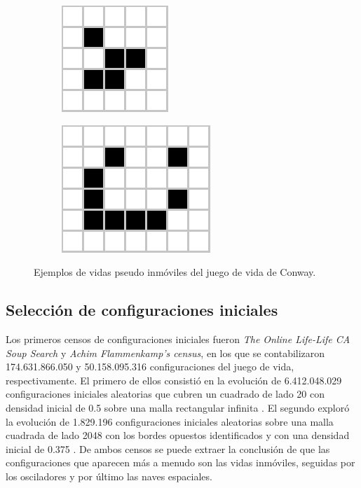 \documentclass[../proyecto.tex]{memoir}
\begin{document}
\begin{figure}[H]
	\centering
	\begin{subfigure}[b]{0.3\linewidth} 
        \centering
        \includegraphics[height=.35\linewidth]{./images/glider.png}
        \caption{}
        \label{fig:glider}
    \end{subfigure}
    \quad
	\begin{subfigure}[b]{0.3\linewidth} 
        \centering
        \includegraphics[height=0.45\linewidth]{./images/lightweightspaceship.png}
        \caption{}
        \label{fig:lightweightspaceship}
    \end{subfigure}
	\caption{Ejemplos de vidas pseudo inmóviles del juego de vida de Conway.}
	\label{fig:congIniciales4}
\end{figure} 

\subsection{Selección de configuraciones iniciales} \label{seleccion}

Los primeros censos de configuraciones iniciales fueron \textit{The Online Life-Life CA Soup Search} y \textit{Achim Flammenkamp's census}, en los que se contabilizaron 174.631.866.050 y 50.158.095.316 configuraciones del juego de vida, respectivamente. El primero de ellos consistió en la evolución de 6.412.048.029 configuraciones iniciales aleatorias que cubren un cuadrado de lado 20 con densidad inicial de 0.5 sobre una malla rectangular infinita \cite{sopa1}. El segundo exploró la evolución de 1.829.196 configuraciones iniciales aleatorias sobre una malla cuadrada de lado 2048 con los bordes opuestos identificados y con una densidad inicial de 0.375 \cite{sopa2}. De ambos censos se puede extraer la conclusión de que las configuraciones que aparecen más a menudo son las vidas inmóviles, seguidas por los osciladores y por último las naves espaciales.
\end{document}
